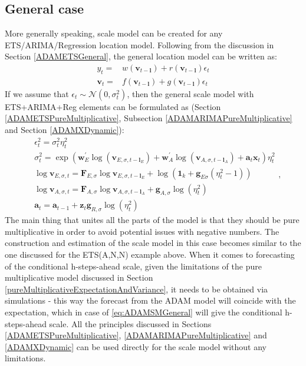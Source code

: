 \documentclass[
]{book}
\theoremstyle{definition}
\theoremstyle{definition}
\theoremstyle{definition}
\theoremstyle{definition}
\theoremstyle{remark}
\begin{document}
\hypertarget{general-case}{%
\subsection{General case}\label{general-case}}

More generally speaking, scale model can be created for any ETS/ARIMA/Regression location model. Following from the discussion in Section \ref{ADAMETSGeneral}, the general location model can be written as:
\begin{equation*}
  \begin{aligned}
    {y}_{t} = & w(\mathbf{v}_{t-\mathbf{l}}) + r(\mathbf{v}_{t-\mathbf{l}}) \epsilon_t \\
    \mathbf{v}_{t} = & f(\mathbf{v}_{t-\mathbf{l}}) + g(\mathbf{v}_{t-\mathbf{l}}) \epsilon_t
  \end{aligned}
\end{equation*}
If we assume that \(\epsilon_t \sim \mathcal{N}(0,\sigma^2_t)\), then the general scale model with ETS+ARIMA+Reg elements can be formulated as (Section \ref{ADAMETSPureMultiplicative}, Subsection \ref{ADAMARIMAPureMultiplicative} and Section \ref{ADAMXDynamic}):
\begin{equation}
  \begin{aligned}
        & \epsilon_t^2 = \sigma_t^2 \eta_{t}^2 \\
        & \sigma_t^2 = \exp \left(\mathbf{w}_E^\prime \log(\mathbf{v}_{E,\sigma,t-\mathbf{l}_E}) + \mathbf{w}_A^\prime \log(\mathbf{v}_{A,\sigma,t-\mathbf{l}_A}) + \mathbf{a}_t \mathbf{x}_t \right)\eta_{t}^2\\
        & \log \mathbf{v}_{E,\sigma,t} = \mathbf{F}_{E,\sigma} \log \mathbf{v}_{E,\sigma,t-\mathbf{l}_E} + \log(\mathbf{1}_k + \mathbf{g}_{E\sigma} (\eta_t^2-1))\\
    & \log \mathbf{v}_{A,\sigma,t} = \mathbf{F}_{A,\sigma} \log \mathbf{v}_{A,\sigma,t-\mathbf{l}_A} + \mathbf{g}_{A,\sigma} \log(\eta_t^2) \\
    & \mathbf{a}_{t} = \mathbf{a}_{t-1} + \mathbf{z}_t \mathbf{g}_{R,\sigma} \log(\eta_t^2)
  \end{aligned},
  \label{eq:ADAMSMGeneral}
\end{equation}
The main thing that unites all the parts of the model is that they should be pure multiplicative in order to avoid potential issues with negative numbers. The construction and estimation of the scale model in this case becomes similar to the one discussed for the ETS(A,N,N) example above. When it comes to forecasting of the conditional h-steps-ahead scale, given the limitations of the pure multiplicative model discussed in Section \ref{pureMultiplicativeExpectationAndVariance}, it needs to be obtained via simulations - this way the forecast from the ADAM model will coincide with the expectation, which in case of \eqref{eq:ADAMSMGeneral} will give the conditional h-steps-ahead scale. All the principles discussed in Sections \ref{ADAMETSPureMultiplicative}, \ref{ADAMARIMAPureMultiplicative} and \ref{ADAMXDynamic} can be used directly for the scale model without any limitations.
\end{document}

